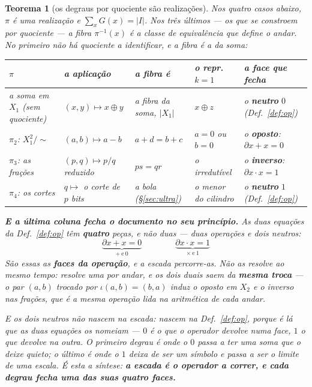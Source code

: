 \documentclass[11pt,a4paper]{article}
\newcommand{\abs}[1]{\lvert #1\rvert}
\newtheorem{teorema}{Teorema}
\begin{document}
\begin{teorema}[os degraus por quociente são realizações]\label{thm:escada}
Nos quatro casos abaixo, $\pi$ é uma realização e $\sum_x G(x)=\abs{I}$. Nos
três últimos --- os que se constroem \emph{por} quociente --- a fibra
$\pi^{-1}(x)$ \emph{é} a classe de equivalência que define o andar. No primeiro
não há quociente a identificar, e a fibra é a da soma:
\begin{center}\footnotesize
\begin{tabular}{@{}lllll@{}}
\toprule
$\pi$ & a aplicação & a fibra é & o repr. $k=1$ & a \textbf{face} que fecha \\
\midrule
a soma em $X_1$ \emph{(sem quociente)} & $(x,y)\mapsto x\oplus y$ & a fibra da soma, $\abs{X_1}$ & $x\oplus z$ & o \textbf{neutro} $0$ (Def.~\ref{def:op}) \\
$\pi_2$: $X_1^{2}/{\sim}$ & $(a,b)\mapsto a-b$ & $a+d=b+c$ & $a=0$ ou $b=0$ & o \textbf{oposto}: $\partial x+x=0$ \\
$\pi_3$: as frações & $(p,q)\mapsto p/q$ reduzido & $ps=qr$ & o irredutível & o \textbf{inverso}: $\partial x\cdot x=1$ \\
$\pi_4$: os cortes & $q\mapsto$ o corte de $p$ bits & a bola (§\ref{sec:ultra}) & o menor do cilindro & o \textbf{neutro} $1$ (Def.~\ref{def:op}) \\
\bottomrule
\end{tabular}
\end{center}

\medskip\noindent\textbf{E a última coluna fecha o documento no seu princípio.}
As duas equações da Def.~\ref{def:op} têm \textbf{quatro} peças, e não duas ---
duas \emph{operações} e dois \emph{neutros}:
\[
\boxed{\;
\underbrace{\partial x+x=0}_{+\ \text{e}\ 0}
\qquad\qquad
\underbrace{\partial x\cdot x=1}_{\times\ \text{e}\ 1}
\;}
\]
São essas as \textbf{faces da operação}, e a escada percorre-as. Não as resolve
ao mesmo tempo: resolve \emph{uma por andar}, e os dois duais saem da
\textbf{mesma troca} --- o par $(a,b)$ trocado por $\iota(a,b)=(b,a)$ induz o
\emph{oposto} em $X_2$ e o \emph{inverso} nas frações, que é a mesma operação
lida na aritmética de cada andar.

\medskip\noindent E os dois neutros não nascem na escada: nascem na
Def.~\ref{def:op}, porque é lá que as duas equações os \emph{nomeiam} --- $0$ é
o que o operador devolve numa face, $1$ o que devolve na outra. O primeiro
degrau é onde o $0$ passa a ter uma soma que o deixe quieto; o último é onde o
$1$ deixa de ser um símbolo e passa a ser o limite de uma escala. É esta a
síntese: \textbf{a escada é o operador a correr, e cada degrau fecha uma das
suas quatro faces.}
\end{teorema}
\end{document}

